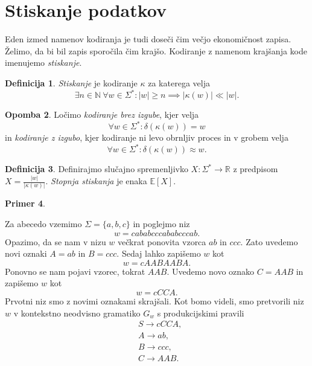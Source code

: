 \documentclass{amsart}
\newcommand{\N}{\mathbb{N}}
\newcommand{\R}{\mathbb{R}}
\theoremstyle{definition}
\newtheorem{definicija}{Definicija}[section]
\newtheorem{primer}[definicija]{Primer}
\newtheorem{opomba}[definicija]{Opomba}
\theoremstyle{plain} %
\begin{document}
\section{Stiskanje podatkov}

Eden izmed namenov kodiranja je tudi doseči čim večjo ekonomičnost zapisa. Želimo, da bi bil zapis
sporočila čim krajšo. Kodiranje z namenom krajšanja kode imenujemo \textit{stiskanje}.

\begin{definicija}
    
    \textit{Stiskanje} je kodiranje $ \kappa $ za katerega velja 
    \[ 
    \exists n \in \N \ \forall w \in \Sigma^* \colon |w| \geq n \implies
    \left\lvert \kappa(w)\right\rvert \ll \left\lvert w \right\rvert.
    \]

\end{definicija}

\begin{opomba}
    
    Ločimo \textit{kodiranje brez izgube}, kjer velja
    \[
        \forall w \in \Sigma^* \colon \delta(\kappa(w)) = w
    \]
    in \textit{kodiranje z izgubo}, kjer kodiranje ni levo obrnljiv proces
    in v grobem velja
    \[
        \forall w \in \Sigma^* \colon \delta(\kappa(w)) \approx w.
    \]

\end{opomba}

\begin{definicija}
    
    Definirajmo slučajno spremenljivko $ X \colon \Sigma^* \to \R $ z predpisom 
    $ X = \frac{|w|}{|\kappa(w)|} $. \textit{Stopnja stiskanja} je enaka $ \mathbb{E}[X] $.

\end{definicija}

\begin{primer}\label{Stiskanje}
    
    Za abecedo vzemimo $ \Sigma = \{ a,b,c \} $ in poglejmo niz
    \[
        w = \mathit{cababcccababcccab}.
    \]
    Opazimo, da se nam v nizu $ w $ večkrat ponovita vzorca $ \mathit{ab} $ in $ \mathit{ccc} $.
    Zato uvedemo novi oznaki $ A = \mathit{ab} $ in $ B = \mathit{ccc} $. Sedaj lahko zapišemo
    $ w $ kot
    \[
        w = \mathit{cAABAABA}.
    \]
    Ponovno se nam pojavi vzorec, tokrat $ \mathit{AAB} $. Uvedemo novo oznako $ C = \mathit{AAB} $
    in zapišemo $ w $ kot
    \[
        w = \mathit{cCCA}.
    \]
    Prvotni niz smo z novimi oznakami skrajšali. Kot bomo videli, smo
    pretvorili niz $ w $ v kontekstno neodvisno gramatiko $ G_w $ s
    produkcijskimi pravili
    \begin{align*}
        & S  \rightarrow  \mathit{cCCA}, \\
        & A  \rightarrow  \mathit{ab}, \\
        & B  \rightarrow  \mathit{ccc}, \\
        & C  \rightarrow  \mathit{AAB}.
    \end{align*}

\end{primer}
\end{document}
